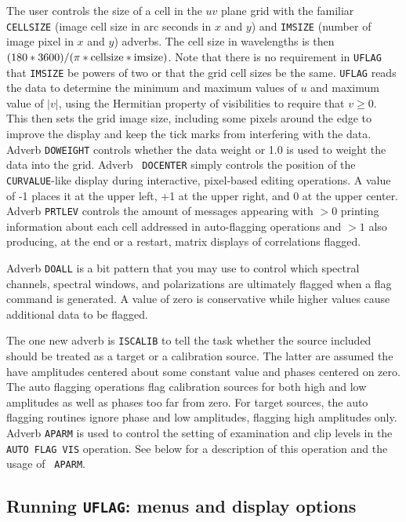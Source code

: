 \documentclass[twoside]{article}
\begin{document}
The user controls the size of a cell in the $uv$ plane grid with the
familiar {\tt CELLSIZE} (image cell size in arc seconds in $x$ and
$y$) and {\tt IMSIZE} (number of image pixel in $x$ and $y$) adverbs.
The cell size in wavelengths is then $(180 * 3600) / (\pi * {\rm
  cellsize} * {\rm imsize})$.  Note that there is no requirement in
{\tt UFLAG} that {\tt IMSIZE} be powers of two or that the grid cell
sizes be the same.  {\tt UFLAG} reads the data to determine the
minimum and maximum values of $u$ and maximum value of $| v |$, using
the Hermitian property of visibilities to require that $v \geq 0$.
This then sets the grid image size, including some pixels around the
edge to improve the display and keep the tick marks from interfering
with the data. Adverb {\tt DOWEIGHT} controls whether the data weight
or 1.0 is used to weight the data into the grid.  Adverb {\tt
  DOCENTER} simply controls the position of the {\tt CURVALUE}-like
display during interactive, pixel-based editing operations.  A value
of -1 places it at the upper left, +1 at the upper right, and 0 at the
upper center.  Adverb {\tt PRTLEV} controls the amount of messages
appearing with $> 0$ printing information about each cell addressed in
auto-flagging operations and $> 1$ also producing, at the end or a
restart, matrix displays of correlations flagged.

Adverb {\tt DOALL} is a bit pattern that you may use to control which
spectral channels, spectral windows, and polarizations are ultimately
flagged when a flag command is generated.  A value of zero is
conservative while higher values cause additional data to be flagged.

The one new adverb is {\tt ISCALIB} to tell the task whether the
source included should be treated as a target or a calibration source.
The latter are assumed the have amplitudes centered about some
constant value and phases centered on zero.  The auto flagging
operations flag calibration sources for both high and low amplitudes
as well as phases too far from zero.  For target sources, the auto
flagging routines ignore phase and low amplitudes, flagging high
amplitudes only.  Adverb {\tt APARM} is used to control the setting of
examination and clip levels in the {\tt AUTO FLAG VIS} operation.  See
below for a description of this operation and the usage of {\tt
  APARM}\@.

\subsection{Running {\tt UFLAG}: menus and display options}
\end{document}
